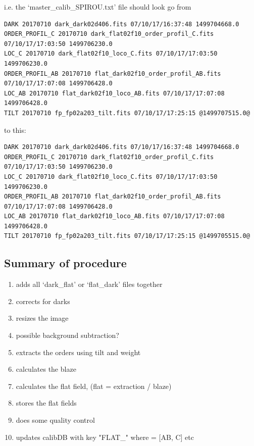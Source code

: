 \noindent i.e. the `master\_calib\_SPIROU.txt' file should look go from
\begin{lstlisting}[style=text]
DARK 20170710 dark_dark02d406.fits 07/10/17/16:37:48 1499704668.0
ORDER_PROFIL_C 20170710 dark_flat02f10_order_profil_C.fits 07/10/17/17:03:50 1499706230.0
LOC_C 20170710 dark_flat02f10_loco_C.fits 07/10/17/17:03:50 1499706230.0
ORDER_PROFIL_AB 20170710 flat_dark02f10_order_profil_AB.fits 07/10/17/17:07:08 1499706428.0
LOC_AB 20170710 flat_dark02f10_loco_AB.fits 07/10/17/17:07:08 1499706428.0
TILT 20170710 fp_fp02a203_tilt.fits 07/10/17/17:25:15 @1499707515.0@
\end{lstlisting}

\noindent to this:

\begin{lstlisting}[style=text]
DARK 20170710 dark_dark02d406.fits 07/10/17/16:37:48 1499704668.0
ORDER_PROFIL_C 20170710 dark_flat02f10_order_profil_C.fits 07/10/17/17:03:50 1499706230.0
LOC_C 20170710 dark_flat02f10_loco_C.fits 07/10/17/17:03:50 1499706230.0
ORDER_PROFIL_AB 20170710 flat_dark02f10_order_profil_AB.fits 07/10/17/17:07:08 1499706428.0
LOC_AB 20170710 flat_dark02f10_loco_AB.fits 07/10/17/17:07:08 1499706428.0
TILT 20170710 fp_fp02a203_tilt.fits 07/10/17/17:25:15 @1499705515.0@

\end{lstlisting}

\subsection{Summary of procedure}
\begin{enumerate}
\item adds all `dark\_flat' or `flat\_dark' files together
\item corrects for darks
\item resizes the image
\item possible background subtraction?
\item extracts the orders using tilt and weight
\item calculates the blaze
\item calculates the flat field, (flat = extraction / blaze)
\item stores the flat fields
\item does some quality control
\item updates calibDB with key "FLAT\_" where  = [AB, C] etc
\end{enumerate}

